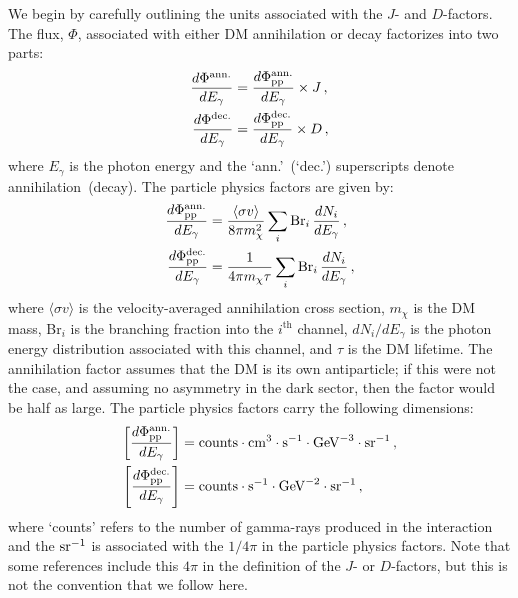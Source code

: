 We begin by carefully outlining the units associated with the $J$- and $D$-factors. 
The flux, $\Phi$, associated with either DM annihilation or decay factorizes into two parts:
\begin{equation}\begin{aligned}
\frac{d\Phi^{\rm ann.}}{dE_{\gamma}} &= \frac{d\Phi_\text{pp}^{\rm ann.}}{dE_{\gamma}}\times J \, , \\
\frac{d\Phi^{\rm dec.}}{dE_{\gamma}} &= \frac{d\Phi_\text{pp}^{\rm dec.}}{dE_{\gamma}}\times D \, ,
\end{aligned}\end{equation}
where $E_\gamma$ is the photon energy and the `ann.'~(`dec.') superscripts denote annihilation~(decay).  
The particle physics factors are given by:
\begin{equation}\begin{aligned}
\frac{d\Phi_\text{pp}^{\rm ann.}}{dE_{\gamma}} &=\frac{\langle\sigma v\rangle}{8\pi m_{\chi}^{2}}\sum_i \text{Br}_{i}\, \frac{dN_{i}}{dE_{\gamma}}\,, \\
\frac{d\Phi_\text{pp}^{\rm dec.}}{dE_{\gamma}} &=\frac{1}{4\pi m_{\chi} \tau}\sum_i \text{Br}_{i}\, \frac{dN_{i}}{dE_{\gamma}}\,,
\end{aligned}\end{equation}
where $\langle \sigma v \rangle$ is the velocity-averaged annihilation cross section, $m_\chi$ is the DM mass, Br$_i$ is the branching fraction into the $i^\text{th}$ channel, $dN_i/dE_\gamma$ is the photon energy distribution associated with this channel, and $\tau$ is the DM lifetime.  The annihilation factor assumes that the DM is its own antiparticle; if this were not the case, and assuming no asymmetry in the dark sector, then the factor would be half as large.  The particle physics factors carry the following dimensions:
\begin{equation}\begin{aligned}
\left[ \frac{d\Phi_\text{pp}^{\rm ann.}}{dE_{\gamma}} \right] &= {\rm counts} \cdot {\rm cm}^3 \cdot {\rm s}^{-1} \cdot {\rm GeV}^{-3} \cdot {\rm sr}^{-1} \,, \\
\left[ \frac{d\Phi_\text{pp}^{\rm dec.}}{dE_{\gamma}} \right] &= {\rm counts} \cdot {\rm s}^{-1} \cdot {\rm GeV}^{-2} \cdot {\rm sr}^{-1}\,,
\label{eq:ppunits}
\end{aligned}\end{equation}
where `counts' refers to the number of gamma-rays produced in the interaction and the ${\rm sr}^{-1}$ is associated with the $1/4\pi$ in the particle physics factors.  Note that some references include this $4\pi$ in the definition of the $J$- or $D$-factors, but this is not the convention that we follow here.


